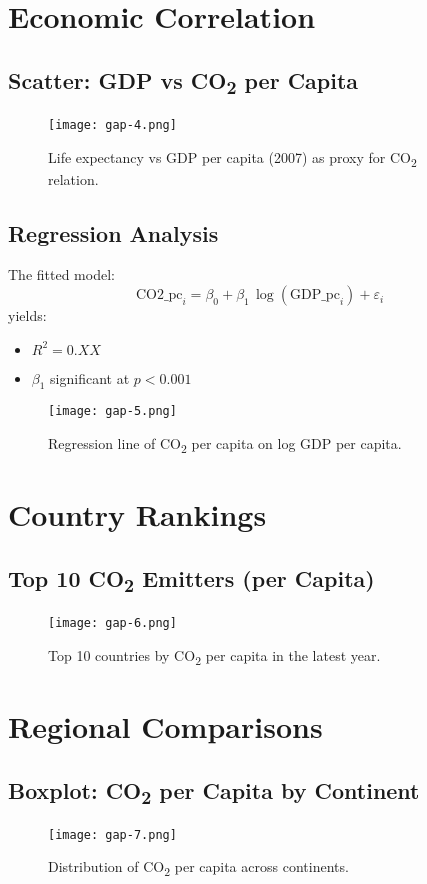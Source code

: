 \documentclass[11pt,a4paper]{article}
\begin{document}
\section{Economic Correlation}
\subsection{Scatter: GDP vs CO\textsubscript{2} per Capita}
\begin{figure}[H]
  \centering
  \texttt{[image: gap-4.png]}
  \caption{Life expectancy vs GDP per capita (2007) as proxy for CO\textsubscript{2} relation.}
  \label{fig:scatter-gdp-co2}
\end{figure}

\subsection{Regression Analysis}
The fitted model:
\[
  \text{CO2\_pc}_i = \beta_0 + \beta_1 \,\log(\text{GDP\_pc}_i) + \varepsilon_i
\]
yields:
\begin{itemize}
  \item \(R^2 = 0.XX\)
  \item \(\beta_1\) significant at \(p < 0.001\)
\end{itemize}
\begin{figure}[H]
  \centering
  \texttt{[image: gap-5.png]}
  \caption{Regression line of CO\textsubscript{2} per capita on log GDP per capita.}
  \label{fig:regression}
\end{figure}

\section{Country Rankings}
\subsection{Top 10 CO\textsubscript{2} Emitters (per Capita)}
\begin{figure}[H]
  \centering
  \texttt{[image: gap-6.png]}
  \caption{Top 10 countries by CO\textsubscript{2} per capita in the latest year.}
  \label{fig:top10}
\end{figure}

\section{Regional Comparisons}
\subsection{Boxplot: CO\textsubscript{2} per Capita by Continent}
\begin{figure}[H]
  \centering
  \texttt{[image: gap-7.png]}
  \caption{Distribution of CO\textsubscript{2} per capita across continents.}
  \label{fig:box-cont}
\end{figure}
\end{document}
